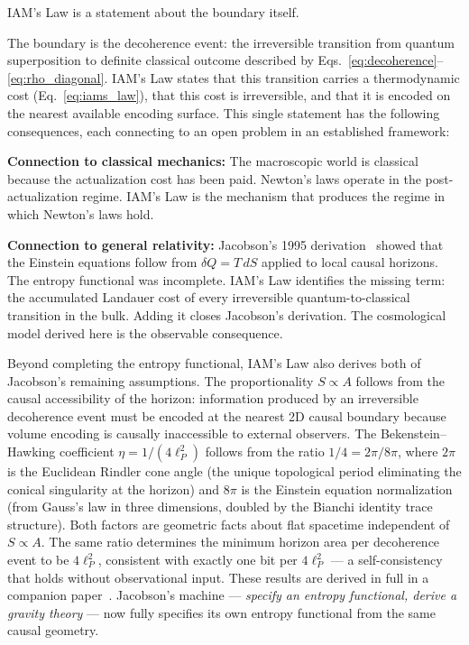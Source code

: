 \documentclass[12pt,a4paper]{article}
\begin{document}
IAM's Law is a statement about the boundary itself.

The boundary is the decoherence event: the irreversible transition
from quantum superposition to definite classical outcome described
by Eqs.~\eqref{eq:decoherence}--\eqref{eq:rho_diagonal}. IAM's Law
states that this transition carries a thermodynamic cost
(Eq.~\eqref{eq:iams_law}), that this cost is irreversible, and that
it is encoded on the nearest available encoding surface. This single
statement has the following consequences, each connecting to an open
problem in an established framework:

\textbf{Connection to classical mechanics:} The macroscopic world
is classical because the actualization cost has been paid. Newton's
laws operate in the post-actualization regime. IAM's Law is the
mechanism that produces the regime in which Newton's laws hold.

\textbf{Connection to general relativity:} Jacobson's
1995 derivation~\citep{Jacobson1995} showed that the Einstein
equations follow from $\delta Q = T\,dS$ applied to local causal
horizons. The entropy functional was incomplete. IAM's Law identifies
the missing term: the accumulated Landauer cost of every irreversible
quantum-to-classical transition in the bulk. Adding it closes
Jacobson's derivation. The cosmological model derived here is the
observable consequence.

Beyond completing the entropy functional, IAM's Law also derives
both of Jacobson's remaining assumptions. The proportionality
$S \propto A$ follows from the causal accessibility of the horizon:
information produced by an irreversible decoherence event must be
encoded at the nearest 2D causal boundary because volume encoding
is causally inaccessible to external observers. The Bekenstein--Hawking
coefficient $\eta = 1/(4\ell_P^2)$ follows from the ratio
$1/4 = 2\pi/8\pi$, where $2\pi$ is the Euclidean Rindler cone angle
(the unique topological period eliminating the conical singularity at
the horizon) and $8\pi$ is the Einstein equation normalization (from
Gauss's law in three dimensions, doubled by the Bianchi identity
trace structure). Both factors are geometric facts about flat
spacetime independent of $S \propto A$. The same ratio determines
the minimum horizon area per decoherence event to be $4\ell_P^2$,
consistent with exactly one bit per $4\ell_P^2$ --- a self-consistency
that holds without observational input. These results are derived
in full in a companion paper~\citep{IAM_archive}. Jacobson's machine
--- \textit{specify an entropy functional, derive a gravity theory}
--- now fully specifies its own entropy functional from the same
causal geometry.
\end{document}
